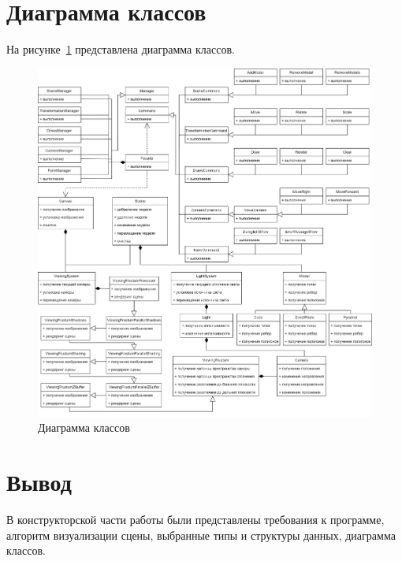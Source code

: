 \section{Диаграмма классов}

На рисунке~\ref{fig:class-diagram} представлена диаграмма классов.

\clearpage

\begin{figure}[h] 
	\centering
	\includegraphics[width=1\textwidth]{images/class-diagram.png}
	\caption{Диаграмма классов} 
	\label{fig:class-diagram} 
\end{figure}

\section{Вывод}

В конструкторской части работы были представлены требования к программе, алгоритм визуализации сцены, выбранные типы и структуры данных, диаграмма классов.

\clearpage
